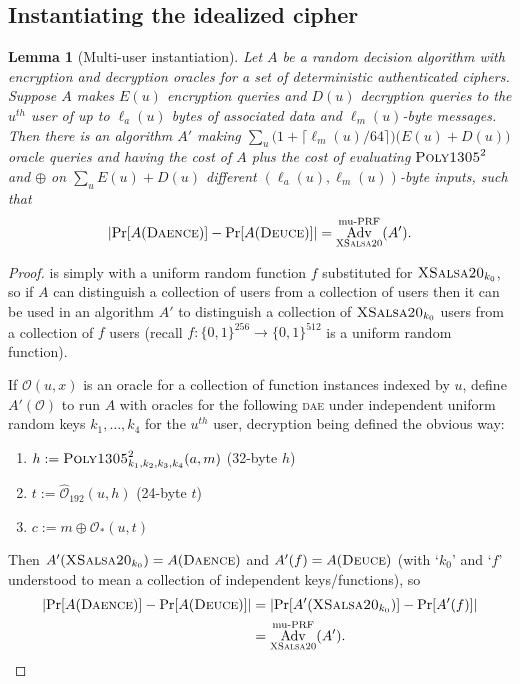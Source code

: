 \documentclass[draft]{article}
\newtheorem{lemma}{Lemma}
\def\operatorsc#1{{%
  \ifmmode\let\next=\operatorname\else\let\next=\relax\fi\next{\textsc{#1}}}}
\def\XSalsa#1/{\operatorsc{XSalsa#1}}
\def\Poly#1/{\operatorsc{Poly#1}}
\def\DAENCE/{\operatorsc{Daence}}
\def\DEUCE/{\operatorsc{Deuce}}
\def\muPRF{%
  \ifmmode\def\next{\operatorname{mu-PRF}}%
    \else\def\next/{mu-\textsc{prf}}%
  \fi\next}
\def\DAE{%
  \ifmmode\def\next{\operatorname{DAE}}%
    \else\def\next/{\textsc{dae}}%
  \fi\next}
\DeclareMathOperator{\Adv}{Adv}
\begin{document}
\subsection{Instantiating the idealized cipher}

\begin{lemma}[Multi-user instantiation]\label{mu-instance}
  Let $A$ be a random decision algorithm with encryption and
   decryption oracles for a \emph{set} of deterministic authenticated
   ciphers.
  Suppose $A$ makes $E(u)$ encryption queries and $D(u)$ decryption
   queries to the $u^{\mathit{th}}$ user of up to $\ell_a(u)$ bytes of
   associated data and $\ell_m(u)$-byte messages.
  Then there is an algorithm $A'$ making
   $\sum_u \bigl(1 + \lceil\ell_m(u)/64\rceil\bigr)
     \bigl(E(u) + D(u)\bigr)$
   oracle queries and having the cost of $A$ plus the cost of
   evaluating $\Poly1305/^2$ and $\oplus$ on
   $\sum_u E(u) + D(u)$
   different $(\ell_a(u), \ell_m(u))$-byte inputs,
   such that
  \[
    \lvert\Pr[A(\DAENCE/)] - \Pr[A(\DEUCE/)]\rvert
    = \Adv^{\muPRF}_{\XSalsa20/}(A').
  \]
\end{lemma}

\begin{proof}
  \DEUCE/ is simply \DAENCE/ with a uniform random function $f$
   substituted for $\XSalsa20/_{k_0}$, so if $A$ can distinguish a
   collection of \DAENCE/ users from a collection of \DEUCE/ users then
   it can be used in an algorithm $A'$ to distinguish a collection of
   $\XSalsa20/_{k_0}$ users from a collection of $f$ users (recall
   $f\colon \{0,1\}^{256} \to \{0,1\}^{512}$ is a
   uniform random function).

  If $\mathcal O(u,x)$ is an oracle for a collection of function
   instances indexed by $u$, define $A'(\mathcal O)$ to run $A$ with
   oracles for the following \DAE/ under independent uniform random keys
   $k_1,\dotsc,k_4$ for the $u^{\mathit{th}}$ user, decryption being
   defined the obvious way:
  \begin{enumerate}
    \item $h := \Poly1305/^2_{k_1,k_2,k_3,k_4}(a, m)$
      \hfill (32-byte $h$)
    \item $t := \hat{\mathcal O}_{192}(u, h)$
      \hfill (24-byte $t$)
    \item $c := m \oplus \mathcal O_*(u, t)$
  \end{enumerate}
  Then $A'(\XSalsa20/_{k_0}) = A(\DAENCE/)$ and $A'(f) = A(\DEUCE/)$
   (with `$k_0$' and `$f$' understood to mean a collection of
   independent keys/functions), so
  \begin{align*}
    \lvert\Pr[A(\DAENCE/)] - \Pr[A(\DEUCE/)]\rvert
    &= \lvert\Pr[A'(\XSalsa20/_{k_0})] - \Pr[A'(f)]\rvert \\
    &= \Adv^{\muPRF}_{\XSalsa20/}(A').
    \qedhere
  \end{align*}
\end{proof}

\end{document}
